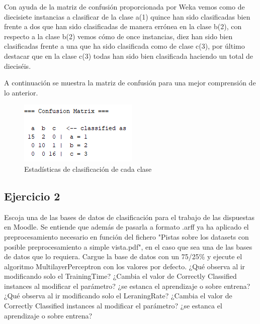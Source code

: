 Con ayuda de la matriz de confusión proporcionada por Weka vemos como de diecisiete instancias a clasificar de la clase a(1) quince han sido clasificadas bien frente a dos que han sido clasificadas de manera errónea en la clase b(2), con respecto a la clase b(2) vemos cómo de once instancias, diez han sido bien clasificadas frente a una que ha sido clasificada como de clase c(3), por último destacar que en la clase c(3) todas han sido bien clasificada haciendo un total de dieciséis.

A continuación se muestra la matriz de confusión para una mejor comprensión de lo anterior. 

\begin{figure}[H]
    \centering
    \includegraphics[width=\textwidth]{img/MC4.5.PNG}
    \caption{Estadísticas de clasificación de cada clase}
\end{figure}

\subsection{Ejercicio 2}

Escoja una de las bases de datos de clasificación para el trabajo de las dispuestas en Moodle. Se entiende que además de pasarla a formato .arff ya ha aplicado el preprocesamiento necesario en función del fichero "Pistas sobre los datasets con posible preprocesamiento a simple vista.pdf", en el caso que sea una de las bases de datos que lo requiera.
Cargue la base de datos con un 75/25\% y ejecute el algoritmo MultilayerPerceptron con los valores por defecto.
¿Qué observa al ir modificando solo el TrainingTime? ¿Cambia el valor de Correctly Classified instances al modificar el parámetro? ¿se estanca el aprendizaje o sobre entrena?
¿Qué observa al ir modificando solo el LeraningRate? ¿Cambia el valor de Correctly Classified instances al modificar el parámetro? ¿se estanca el aprendizaje o sobre entrena?

